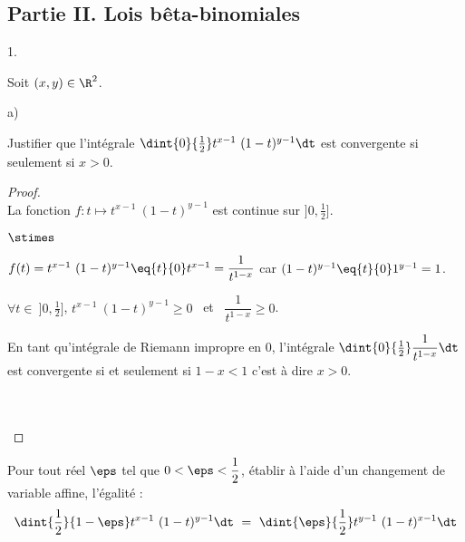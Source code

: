 \newpage


\subsection*{Partie II. Lois bêta-binomiales}

\begin{noliste}{1.}
  \setlength{\itemsep}{4mm} %
  \setcounter{enumi}{3}
\item Soit $(x,y) \in \R^2$.
  \begin{noliste}{a)}
    \setlength{\itemsep}{2mm}
  \item Justifier que l'intégrale $\dint{0}{\frac{1}{2}} t^{x-1} \
    (1-t)^{y-1} \dt$ est convergente si seulement si $x>0$.

    \begin{proof}~\\%
      La fonction $f : t \mapsto t^{x-1} \ (1-t)^{y-1}$ est continue
      sur $]0, \frac{1}{2}]$.
      \begin{noliste}{$\stimes$}
      \item $f(t) = t^{x-1} \ (1-t)^{y-1} \eq{t}{0} t^{x-1} =
        \dfrac{1}{t^{1-x}}$ \quad car \quad $(1-t)^{y-1} \eq{t}{0}
        1^{y-1} = 1$.
        
      \item $\forall t \in \ ]0, \frac{1}{2}]$, $t^{x-1} \ (1-t)^{y-1}
        \geq 0$ \ et \ $\dfrac{1}{t^{1-x}} \geq 0$.
        
      \item En tant qu'intégrale de Riemann impropre en $0$,
        l'intégrale $\dint{0}{\frac{1}{2}} \dfrac{1}{t^{1-x}} \dt$ est
        convergente si et seulement si $1 - x < 1$ c'est à dire $x >
        0$.
      \end{noliste}~\\[-1.4cm]
      ~\\[-1cm]
    \end{proof}
    
  \item Pour tout réel $\eps$ tel que $0 < \eps < \dfrac{1}{2}$,
    établir à l'aide d'un changement de variable affine, l'égalité :
    \[
    \dint{\frac{1}{2}}{1-\eps} t^{x-1} \ (1-t)^{y-1} \dt \ = \
    \dint{\eps}{\frac{1}{2}} t^{y-1} \ (1-t)^{x-1} \dt
    \]


\end{noliste}
\end{noliste}
